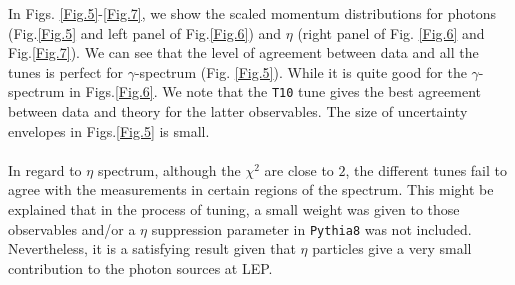 \documentclass[aps,preprint,floatfix,nofootinbib,showpacs]{revtex4-1}
\begin{document}
In Figs. \ref{Fig.5}-\ref{Fig.7}, we show the scaled
momentum distributions for photons (Fig.\ref{Fig.5} and
left panel of Fig.\ref{Fig.6}) and $\eta$ (right panel
of Fig. \ref{Fig.6} and Fig.\ref{Fig.7}). We can see that
the level of agreement between data and all the tunes
is perfect for $\gamma$-spectrum (Fig. \ref{Fig.5}). While
it is quite good for the $\gamma$-spectrum in 
Figs.\ref{Fig.6}. We note that the 
\texttt{T10} tune gives the best agreement between data and 
theory for the latter observables. The size of uncertainty
envelopes in Figs.\ref{Fig.5} is small. \\ \\
In regard to $\eta$ spectrum, although the $\chi^2$ are 
close to $2$, the different tunes fail to agree with the measurements
in certain regions of the spectrum. This might be explained
that in the process of tuning, a small weight was given to those
observables and/or a $\eta$ suppression parameter in
\texttt{Pythia8} was not included. Nevertheless, it is
a satisfying result given that $\eta$ particles give a very small contribution
to the photon sources at LEP.
\end{document}
